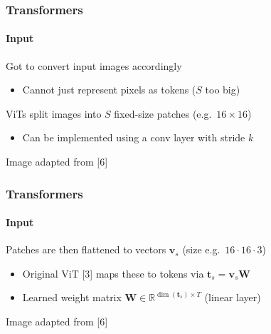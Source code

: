 \documentclass[xetex,professionalfont]{beamer}
\newcommand{\RR}{\mathbb{R}}
\renewcommand{\vec}[1]{\ensuremath{\mathbf{#1}}}
\newcommand{\vt}{\vec{t}}
\newcommand{\vv}{\vec{v}}
\newcommand{\vW}{\vec{W}}
\begin{document}
\begin{frame}
	\frametitle{Transformers}
	\framesubtitle{Input}

	Got to convert input images accordingly
	\begin{itemize}
		\item Cannot just represent pixels as tokens ($S$ too big)
	\end{itemize}

	\bigskip

	ViTs split images into $S$ fixed-size patches (e.g.~$16\times16$) %
	\begin{itemize}
		\item Can be implemented using a conv layer with stride $k$ %
	\end{itemize}

	\medskip

	\begin{center}
		{\centering Image adapted from [6]}
	\end{center}

\end{frame}


\begin{frame}
	\frametitle{Transformers}
	\framesubtitle{Input}

	Patches are then flattened to vectors $\vv_s$ (size e.g.~$16\cdot16\cdot3$) %
	\begin{itemize}
		\item Original ViT [3] maps these to tokens via $\vt_s=\vv_s\vW$
		\item Learned weight matrix $\vW\in\RR^{\dim(\vt_s)\times T}$ (linear layer) %
	\end{itemize}

	\medskip

	\begin{center}
		{\centering Image adapted from [6]}
	\end{center}

\end{frame}
\end{document}
